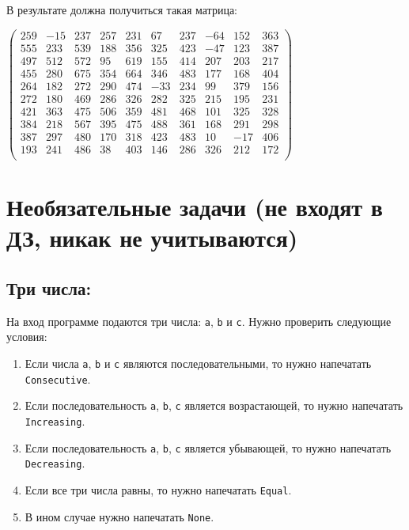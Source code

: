 \documentclass[10pt]{article}
\begin{document}
В результате должна получиться такая матрица:
\begin{center}
$
\begin{pmatrix}
259 & -15 & 237 & 257 &  231 &  67  & 237  & -64  & 152  & 363 \\
555 & 233 & 539 & 188 &  356 &  325 &  423 &  -47 &  123 &  387 \\
497 & 512 & 572 & 95  & 619  & 155  & 414  & 207  & 203  & 217 \\
455 & 280 & 675 & 354 &  664 &  346 &  483 &  177 &  168 &  404 \\
264 & 182 & 272 & 290 &  474 &  -33 &  234 &  99  & 379  & 156 \\
272 & 180 & 469 & 286 &  326 &  282 &  325 &  215 &  195 &  231 \\
421 & 363 & 475 & 506 &  359 &  481 &  468 &  101 &  325 &  328 \\
384 & 218 & 567 & 395 &  475 &  488 &  361 &  168 &  291 &  298 \\
387 & 297 & 480 & 170 &  318 &  423 &  483 &  10  & -17  & 406 \\
193 & 241 & 486 & 38  & 403  & 146  & 286  & 326  & 212  & 172 \\
\end{pmatrix}
$
\end{center}










\newpage
\section*{Необязательные задачи (не входят в ДЗ, никак не учитываются)}
\setcounter{subsection}{0}

\subsection{Три числа:}
На вход программе подаются три числа: \texttt{a}, \texttt{b} и \texttt{c}. Нужно проверить следующие условия:
\begin{enumerate}
\item Если числа \texttt{a}, \texttt{b} и \texttt{c} являются последовательными, то нужно напечатать \texttt{Consecutive}.
\item Если последовательность \texttt{a}, \texttt{b}, \texttt{c} является возрастающей, то нужно напечатать \texttt{Increasing}.
\item Если последовательность \texttt{a}, \texttt{b}, \texttt{c} является убывающей, то нужно напечатать \texttt{Decreasing}.
\item Если все три числа равны, то нужно напечатать \texttt{Equal}.
\item В ином случае нужно напечатать \texttt{None}.
\end{enumerate}
\end{document}
